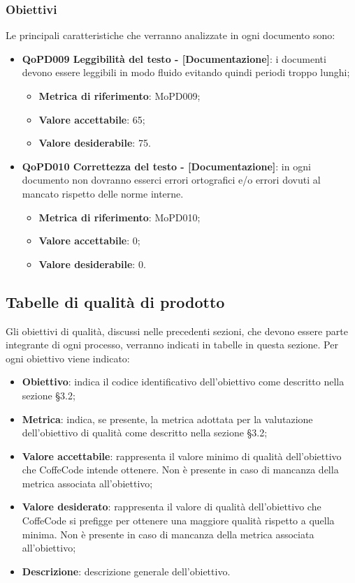\documentclass[../piano-di-qualifica.tex]{subfiles}
\begin{document}
\subsubsection{Obiettivi}
\label{sub:obiettivi}
Le principali caratteristiche che verranno analizzate in ogni documento sono:
\begin{itemize}
    \item \textbf{QoPD009 Leggibilità del testo - [Documentazione]}: i documenti devono essere leggibili in modo fluido evitando quindi periodi troppo lunghi;
        \begin{itemize}
            \item \textbf{Metrica di riferimento}: MoPD009;
            \item \textbf{Valore accettabile}: 65;
            \item \textbf{Valore desiderabile}: 75.
        \end{itemize}
    \item \textbf{QoPD010 Correttezza del testo - [Documentazione]}: in ogni documento non dovranno esserci errori ortografici e/o errori dovuti al mancato rispetto delle norme interne.
        \begin{itemize}
            \item \textbf{Metrica di riferimento}: MoPD010;
            \item \textbf{Valore accettabile}: 0;
            \item \textbf{Valore desiderabile}: 0.
        \end{itemize}
\end{itemize}

\subsection{Tabelle di qualità di prodotto}
\label{sub:tabelle_di_qualita_di_prodotto}
Gli obiettivi di qualità, discussi nelle precedenti sezioni, che devono essere parte integrante di ogni processo, verranno indicati in tabelle in questa sezione.
Per ogni obiettivo viene indicato:

\begin{itemize}
   \item \textbf{Obiettivo}: indica il codice identificativo dell'obiettivo come descritto nella sezione §3.2;
   \item \textbf{Metrica}: indica, se presente, la metrica adottata per la valutazione dell'obiettivo di qualità come descritto nella sezione §3.2;
   \item \textbf{Valore accettabile}: rappresenta il valore minimo di qualità dell'obiettivo che CoffeCode intende ottenere. Non è presente in caso di mancanza della metrica associata all'obiettivo;
   \item \textbf{Valore desiderato}: rappresenta il valore di qualità dell'obiettivo che CoffeCode si prefigge per ottenere una maggiore qualità rispetto a quella minima. Non è presente in caso di mancanza della metrica associata all'obiettivo;
   \item \textbf{Descrizione}: descrizione generale dell'obiettivo.
\end{itemize}
\end{document}
